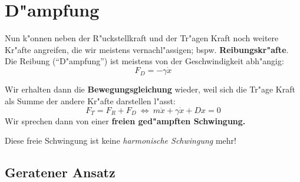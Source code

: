 







\section{D"ampfung}
\label{kap_dampfung}

Nun k"onnen neben der R"uckstellkraft und der Tr"agen Kraft noch
weitere Kr"afte angreifen, die wir meistens vernachl"assigen;
bspw. \textbf{Reibungskr"afte}. Die Reibung
("`D"ampfung"') ist meistens von der
Geschwindigkeit abh"angig:
\begin{equation}
   \label{eq:102}
   F_D = - \gamma \dot x
\end{equation}

Wir erhalten dann die \textbf{Bewegungsgleichung} wieder, weil sich
die Tr"age Kraft als Summe der andere Kr"afte darstellen l"asst:
\begin{equation}
   \label{eqn_schwingung-reibung}
   F_T = F_R + F_D ~ \Leftrightarrow ~\boxed{ m\ddot x + \gamma \dot x
     + Dx = 0 }
\end{equation}
Wir sprechen dann von einer \textbf{freien ged"ampften Schwingung.}

Diese freie Schwingung ist keine \emph{harmonische Schwingung} mehr!



\subsection{Geratener Ansatz}
\label{kap_geratener-ansatz}




